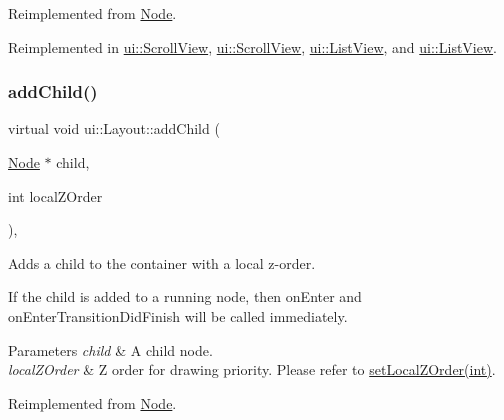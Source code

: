 Reimplemented from \hyperlink{classNode_a132699398b350e83b548a5645e69beb0}{Node}.



Reimplemented in \hyperlink{classui_1_1ScrollView_a33a556579ca4e24b016a787af18cfcae}{ui\+::\+Scroll\+View}, \hyperlink{classui_1_1ScrollView_a6cdee934880e71245c6f5e6a2789c48a}{ui\+::\+Scroll\+View}, \hyperlink{classui_1_1ListView_a7fb7f42f3f3ee9e9ca8ee3bb959e2c32}{ui\+::\+List\+View}, and \hyperlink{classui_1_1ListView_aeee2116f21f0e89de5a2e1b9cc93e012}{ui\+::\+List\+View}.

\mbox{\label{classui_1_1Layout_aa9947ec25c709fa839fdec1795ae2a2c}} 
\subsubsection{\texorpdfstring{add\+Child()}{addChild()}\hspace{0.1cm}{\footnotesize\ttfamily [4/8]}}
{\footnotesize\ttfamily virtual void ui\+::\+Layout\+::add\+Child (\begin{DoxyParamCaption}\item[{\hyperlink{classNode}{Node} $\ast$}]{child,  }\item[{int}]{local\+Z\+Order }\end{DoxyParamCaption})\hspace{0.3cm}{\ttfamily [override]}, {\ttfamily [virtual]}}

Adds a child to the container with a local z-\/order.

If the child is added to a \textquotesingle{}running\textquotesingle{} node, then \textquotesingle{}on\+Enter\textquotesingle{} and \textquotesingle{}on\+Enter\+Transition\+Did\+Finish\textquotesingle{} will be called immediately.


\begin{DoxyParams}{Parameters}
{\em child} & A child node. \\
\hline
{\em local\+Z\+Order} & Z order for drawing priority. Please refer to {\ttfamily \hyperlink{classNode_aee4e616c2d55b722226aae1e68b4946f}{set\+Local\+Z\+Order(int)}}. \\
\hline
\end{DoxyParams}


Reimplemented from \hyperlink{classNode_ad0005bbb94623abd997ce7c3116e6212}{Node}.




